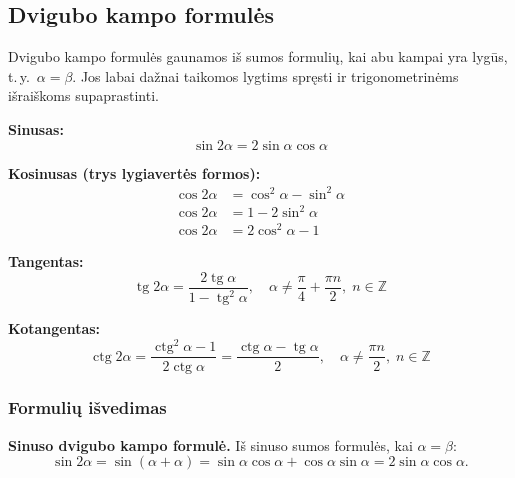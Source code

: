 \subsection{Dvigubo kampo formulės}

Dvigubo kampo formulės gaunamos iš sumos formulių, kai abu kampai yra lygūs,
t.\,y.\ $\alpha = \beta$. Jos labai dažnai taikomos lygtims spręsti ir
trigonometrinėms išraiškoms supaprastinti.

\begin{tcolorbox}[colback=orange!5!white, colframe=orange!60!black,
    title=Dvigubo kampo formulės]
\textbf{Sinusas:}
\begin{equation}
  \sin 2\alpha = 2\sin\alpha\cos\alpha
\end{equation}

\textbf{Kosinusas (trys lygiavertės formos):}
\begin{align}
  \cos 2\alpha &= \cos^2\alpha - \sin^2\alpha \\
  \cos 2\alpha &= 1 - 2\sin^2\alpha \\
  \cos 2\alpha &= 2\cos^2\alpha - 1
\end{align}

\textbf{Tangentas:}
\begin{equation}
  \operatorname{tg} 2\alpha
  = \frac{2\operatorname{tg}\alpha}{1 - \operatorname{tg}^2\!\alpha},
  \quad \alpha \neq \frac{\pi}{4} + \frac{\pi n}{2},\; n\in\mathbb{Z}
\end{equation}

\textbf{Kotangentas:}
\begin{equation}
  \operatorname{ctg} 2\alpha
  = \frac{\operatorname{ctg}^2\!\alpha - 1}{2\operatorname{ctg}\alpha}
  = \frac{\operatorname{ctg}\alpha - \operatorname{tg}\alpha}{2},
  \quad \alpha \neq \frac{\pi n}{2},\; n\in\mathbb{Z}
\end{equation}
\end{tcolorbox}

\subsubsection*{Formulių išvedimas}

\textbf{Sinuso dvigubo kampo formulė.} Iš sinuso sumos formulės, kai
$\alpha = \beta$:
\[
  \sin 2\alpha = \sin(\alpha+\alpha)
  = \sin\alpha\cos\alpha + \cos\alpha\sin\alpha
  = 2\sin\alpha\cos\alpha.
\]

